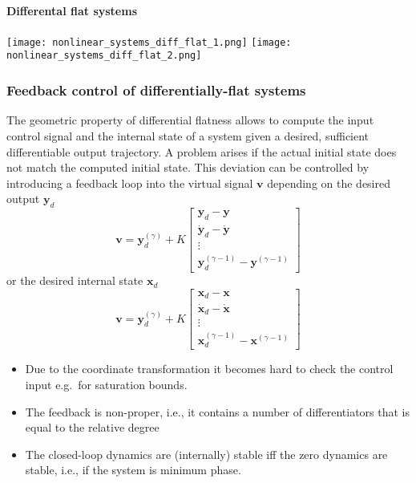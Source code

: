 \paragraph{Differental flat systems}
\begin{center}
    \texttt{[image: nonlinear\_systems\_diff\_flat\_1.png]}
    \texttt{[image: nonlinear\_systems\_diff\_flat\_2.png]}
\end{center}

\subsubsection{Feedback control of differentially-flat systems}
The geometric property of differential flatness allows to compute the input control signal and the internal state of a system given a desired, sufficient differentiable output trajectory. A problem arises if the actual initial state does not match the computed initial state. This deviation can be controlled by introducing a feedback loop into the virtual signal $\mathbf{v}$ depending on the desired output $\mathbf{y}_d$
\begin{equation*}
    \mathbf{v} = \mathbf{y}_d^{(\gamma)} + K \begin{bmatrix}
        \mathbf{y}_d - \mathbf{y}             \\
        \dot{\mathbf{y}}_d - \dot{\mathbf{y}} \\
        \vdots                                \\
        \mathbf{y}_d^{(\gamma-1)} - \mathbf{y}^{(\gamma-1)}
    \end{bmatrix}
\end{equation*}
or the desired internal state $\mathbf{x}_d$
\begin{equation*}
    \mathbf{v} = \mathbf{y}_d^{(\gamma)} + K \begin{bmatrix}
        \mathbf{x}_d - \mathbf{x}             \\
        \dot{\mathbf{x}}_d - \dot{\mathbf{x}} \\
        \vdots                                \\
        \mathbf{x}_d^{(\gamma-1)} - \mathbf{x}^{(\gamma-1)}
    \end{bmatrix}
\end{equation*}

\newpar{}
\begin{itemize}
    \item Due to the coordinate transformation it becomes hard to check the control input e.g.\ for saturation bounds.
    \item The feedback is non-proper, i.e., it contains a number of differentiators that is equal to the relative degree
    \item The closed-loop dynamics are (internally) stable iff the zero dynamics are stable, i.e., if the system is minimum phase.
\end{itemize}

